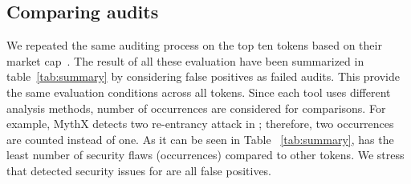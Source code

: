 
\subsection{Comparing audits}
We repeated the same auditing process on the top ten tokens based on their market cap~\cite{EtherScan}. The result of all these evaluation have been summarized in table~\ref{tab:summary} by considering false positives as failed audits. This provide the same evaluation conditions across all tokens. Since each tool uses different analysis methods, number of occurrences are considered for comparisons. For example, MythX detects two re-entrancy attack in \sys; therefore, two occurrences are counted instead of one. As it can be seen in Table ~\ref{tab:summary}, \sys has the least number of security flaws (occurrences) compared to other tokens. We stress that detected security issues for \sys are all false positives.



